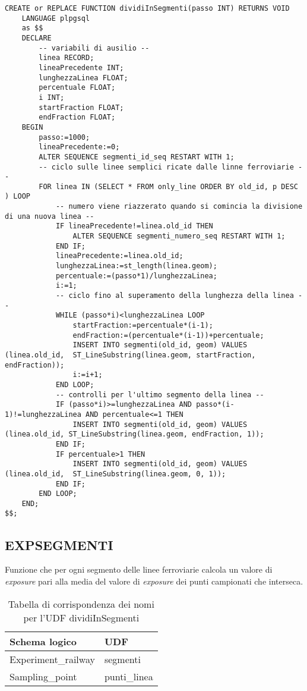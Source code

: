 \begin{lstlisting}[style=mySQL]
CREATE or REPLACE FUNCTION dividiInSegmenti(passo INT) RETURNS VOID
	LANGUAGE plpgsql
	as $$
	DECLARE
		-- variabili di ausilio --
		linea RECORD;
		lineaPrecedente INT;
		lunghezzaLinea FLOAT;
		percentuale FLOAT;
		i INT;
		startFraction FLOAT;
		endFraction FLOAT;
	BEGIN
		passo:=1000;
		lineaPrecedente:=0;
		ALTER SEQUENCE segmenti_id_seq RESTART WITH 1;
		-- ciclo sulle linee semplici ricate dalle linne ferroviarie --
		FOR linea IN (SELECT * FROM only_line ORDER BY old_id, p DESC ) LOOP
			-- numero viene riazzerato quando si comincia la divisione di una nuova linea --
			IF lineaPrecedente!=linea.old_id THEN
				ALTER SEQUENCE segmenti_numero_seq RESTART WITH 1;
			END IF;
			lineaPrecedente:=linea.old_id;
			lunghezzaLinea:=st_length(linea.geom);
			percentuale:=(passo*1)/lunghezzaLinea;
			i:=1;
			-- ciclo fino al superamento della lunghezza della linea --
			WHILE (passo*i)<lunghezzaLinea LOOP
				startFraction:=percentuale*(i-1);
				endFraction:=(percentuale*(i-1))+percentuale;
				INSERT INTO segmenti(old_id, geom) VALUES (linea.old_id,  ST_LineSubstring(linea.geom, startFraction, endFraction));
				i:=i+1;
			END LOOP;
			-- controlli per l'ultimo segmento della linea --
			IF (passo*i)>=lunghezzaLinea AND passo*(i-1)!=lunghezzaLinea AND percentuale<=1 THEN
				INSERT INTO segmenti(old_id, geom) VALUES (linea.old_id, ST_LineSubstring(linea.geom, endFraction, 1));
			END IF;
			IF percentuale>1 THEN
				INSERT INTO segmenti(old_id, geom) VALUES (linea.old_id,  ST_LineSubstring(linea.geom, 0, 1));
			END IF;
		END LOOP;
	END;
$$;
\end{lstlisting}

\subsection{\textbf{EXPSEGMENTI}}
Funzione che per ogni segmento delle linee ferroviarie calcola un valore di \textit{exposure} pari alla media del valore di \textit{exposure} dei punti campionati che interseca.\\

\begin{table}[h]
\centering
\caption{Tabella di corrispondenza dei nomi per l'UDF dividiInSegmenti}
\label{mapTb6}
\begin{tabular}{|l|l|}
\hline
Schema logico       & UDF                \\ \hline
Experiment\_railway          & segmenti              \\ 
Sampling\_point          & punti\_linea              \\ \hline
\end{tabular}
\end{table}


